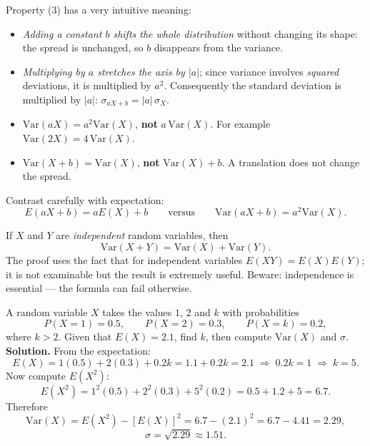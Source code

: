 \documentclass[11pt]{article}
\begin{document}
Property (3) has a very intuitive meaning:
\begin{itemize}
\item \emph{Adding a constant $b$ shifts the whole distribution} without changing its shape: the spread is unchanged, so $b$ disappears from the variance.
\item \emph{Multiplying by $a$ stretches the axis by $|a|$}; since variance involves \emph{squared} deviations, it is multiplied by $a^2$. Consequently the standard deviation is multiplied by $|a|$: $\sigma_{aX+b} = |a|\,\sigma_X$.
\end{itemize}

\begin{attention}
\begin{itemize}
\item $\mathrm{Var}(aX) = a^2\mathrm{Var}(X)$, \textbf{not} $a\,\mathrm{Var}(X)$. For example $\mathrm{Var}(2X) = 4\,\mathrm{Var}(X)$.
\item $\mathrm{Var}(X + b) = \mathrm{Var}(X)$, \textbf{not} $\mathrm{Var}(X) + b$. A translation does not change the spread.
\end{itemize}
Contrast carefully with expectation:
\[ E(aX+b) = aE(X) + b \qquad\text{versus}\qquad \mathrm{Var}(aX+b) = a^2\mathrm{Var}(X). \]
\end{attention}

\begin{propriete}
If $X$ and $Y$ are \emph{independent} random variables, then
\[ \mathrm{Var}(X+Y) = \mathrm{Var}(X) + \mathrm{Var}(Y). \]
The proof uses the fact that for independent variables $E(XY) = E(X)E(Y)$; it is not examinable but the result is extremely useful. Beware: independence is essential — the formula can fail otherwise.
\end{propriete}

\begin{exoresolu}
A random variable $X$ takes the values $1$, $2$ and $k$ with probabilities
\[ P(X=1) = 0.5, \qquad P(X=2) = 0.3, \qquad P(X=k) = 0.2, \]
where $k > 2$. Given that $E(X) = 2.1$, find $k$, then compute $\mathrm{Var}(X)$ and $\sigma$.
\tcblower
\textbf{Solution.} From the expectation:
\[ E(X) = 1(0.5) + 2(0.3) + 0.2k = 1.1 + 0.2k = 2.1 \;\Longrightarrow\; 0.2k = 1 \;\Longrightarrow\; k = 5. \]
Now compute $E(X^2)$:
\[ E(X^2) = 1^2(0.5) + 2^2(0.3) + 5^2(0.2) = 0.5 + 1.2 + 5 = 6.7. \]
Therefore
\[ \mathrm{Var}(X) = E(X^2) - [E(X)]^2 = 6.7 - (2.1)^2 = 6.7 - 4.41 = 2.29, \]
\[ \sigma = \sqrt{2.29} \approx 1.51. \]
\end{exoresolu}
\end{document}
